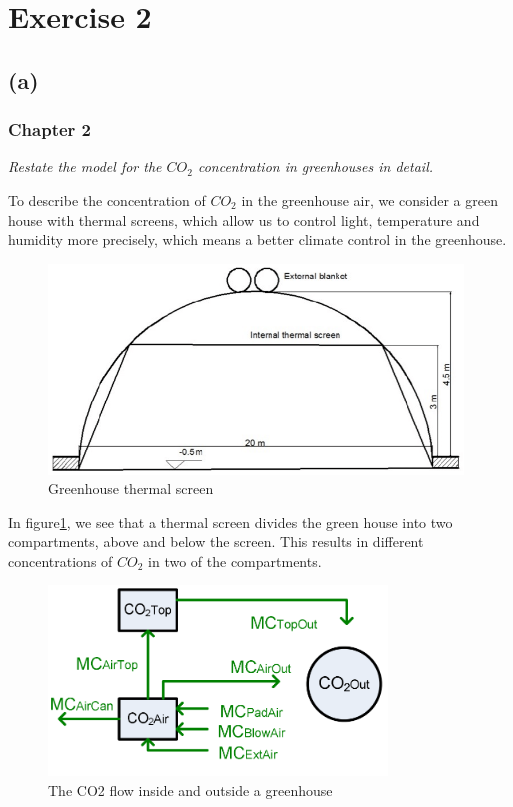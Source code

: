 \documentclass[a4paper]{article}
\begin{document}


\newpage
\section{Exercise 2}
\subsection{(a)}
\subsubsection{Chapter 2}
\textit{Restate the model for the \(CO_2\) concentration in greenhouses in detail.}


To describe the concentration of \(CO_2\) in the greenhouse air, we consider a green house with thermal screens, which allow us to control light, temperature and humidity more precisely, which means a better climate control in the greenhouse.
\begin{figure}[H]
  \centering
  \includegraphics[width=11cm]{thrscr.png}
  \caption{Greenhouse thermal screen}\label{fig:thrscr}
\end{figure}

In figure{}\ref{fig:thrscr}, we see that a thermal screen divides the green house into two compartments, above and below the screen.
This results in different concentrations of \(CO_2\) in two of the compartments.

\begin{figure}[H]
  \centering
  \includegraphics[width=9cm]{CO2}
  \caption{The CO2 flow inside and outside a greenhouse}\label{fig:CO2}
\end{figure}
\end{document}
